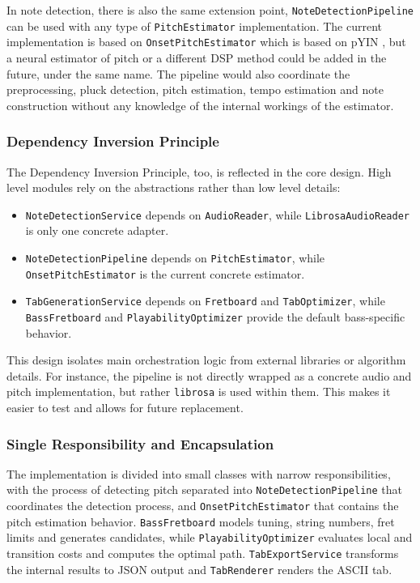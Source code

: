 \documentclass[a4paper, 12pt, titlepage]{article}
\begin{document}
In note detection, there is also the same extension point, \texttt{NoteDetectionPipeline} can be used with any type of \texttt{PitchEstimator} implementation. The current implementation is based on \texttt{OnsetPitchEstimator} which is based on pYIN \cite{mauch2014}, but a neural estimator of pitch or a different DSP method could be added in the future, under the same name. The pipeline would also coordinate the preprocessing, pluck detection, pitch estimation, tempo estimation and note construction without any knowledge of the internal workings of the estimator.

\subsubsection{Dependency Inversion Principle}

The Dependency Inversion Principle, too, is reflected in the core design. High level modules rely on the abstractions rather than low level details:

\begin{itemize}[leftmargin=*, label=$\bullet$]
    \item \texttt{NoteDetectionService} depends on \texttt{AudioReader}, while \texttt{LibrosaAudioReader} is only one concrete adapter.
    \item \texttt{NoteDetectionPipeline} depends on \texttt{PitchEstimator}, while \texttt{OnsetPitchEstimator} is the current concrete estimator.
    \item \texttt{TabGenerationService} depends on \texttt{Fretboard} and \texttt{TabOptimizer}, while \texttt{BassFretboard} and \texttt{PlayabilityOptimizer} provide the default bass-specific behavior.
\end{itemize}

This design isolates main orchestration logic from external libraries or algorithm details. For instance, the pipeline is not directly wrapped as a concrete audio and pitch implementation, but rather \texttt{librosa} is used within them. This makes it easier to test and allows for future replacement.

\subsubsection{Single Responsibility and Encapsulation}

The implementation is divided into small classes with narrow responsibilities, with the process of detecting pitch separated into \texttt{NoteDetectionPipeline} that coordinates the detection process, and \texttt{OnsetPitchEstimator} that contains the pitch estimation behavior. \texttt{BassFretboard} models tuning, string numbers, fret limits and generates candidates, while \texttt{PlayabilityOptimizer} evaluates local and transition costs and computes the optimal path. \texttt{TabExportService} transforms the internal results to JSON output and \texttt{TabRenderer} renders the ASCII tab.
\end{document}
